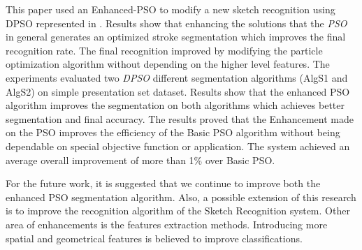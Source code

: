 \documentclass[10pt]{article}
\begin{document}
This paper used an Enhanced-PSO  to modify a new sketch recognition using DPSO represented in \cite{mypaper}. Results show that enhancing the solutions that the \textit{PSO} in general generates an optimized stroke segmentation which improves the final recognition rate.  The final recognition improved by modifying the particle optimization algorithm without depending on the higher level features. The experiments evaluated two \textit{DPSO} different segmentation algorithms (AlgS1 and AlgS2) on simple presentation set dataset. Results show that the enhanced PSO algorithm improves the segmentation on both algorithms which achieves better segmentation and final accuracy. The results proved that the Enhancement made on the PSO improves the efficiency of the Basic PSO algorithm without being dependable on special objective function or application. The system achieved an average overall improvement of more than 1\% over Basic PSO.  

 For the future work, it is suggested that we continue to improve both the enhanced PSO segmentation algorithm. Also, a possible extension of this research is to improve the recognition algorithm of the Sketch Recognition system. Other area of enhancements is the features extraction methods. Introducing more spatial and geometrical features is believed to improve classifications. 



\end{document}
